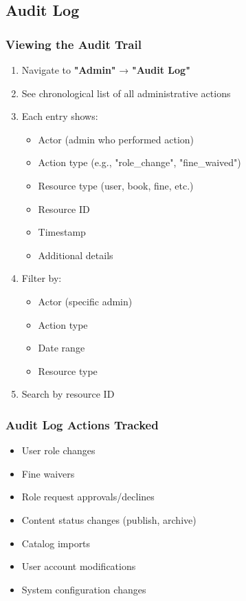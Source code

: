 \documentclass[12pt,a4paper]{article}
\begin{document}
\newpage

\subsection{Audit Log}

\subsubsection{Viewing the Audit Trail}
\begin{enumerate}[leftmargin=*]
    \item Navigate to \textbf{"Admin"} → \textbf{"Audit Log"}
    \item See chronological list of all administrative actions
    \item Each entry shows:
        \begin{itemize}
            \item Actor (admin who performed action)
            \item Action type (e.g., "role\_change", "fine\_waived")
            \item Resource type (user, book, fine, etc.)
            \item Resource ID
            \item Timestamp
            \item Additional details
        \end{itemize}
    \item Filter by:
        \begin{itemize}
            \item Actor (specific admin)
            \item Action type
            \item Date range
            \item Resource type
        \end{itemize}
    \item Search by resource ID
\end{enumerate}

\subsubsection{Audit Log Actions Tracked}
\begin{itemize}[leftmargin=*]
    \item User role changes
    \item Fine waivers
    \item Role request approvals/declines
    \item Content status changes (publish, archive)
    \item Catalog imports
    \item User account modifications
    \item System configuration changes
\end{itemize}
\end{document}
